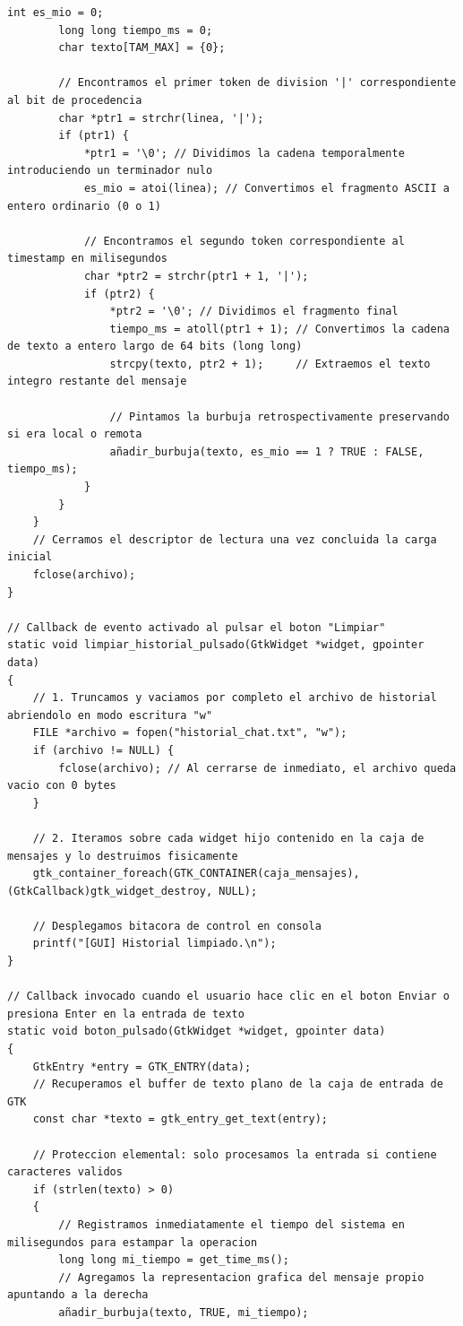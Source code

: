 \begin{lstlisting}[style=estiloC, caption={Archivo del Front-End (conexion P2P)}]
        int es_mio = 0;
        long long tiempo_ms = 0;
        char texto[TAM_MAX] = {0};

        // Encontramos el primer token de division '|' correspondiente al bit de procedencia
        char *ptr1 = strchr(linea, '|');
        if (ptr1) {
            *ptr1 = '\0'; // Dividimos la cadena temporalmente introduciendo un terminador nulo
            es_mio = atoi(linea); // Convertimos el fragmento ASCII a entero ordinario (0 o 1)
            
            // Encontramos el segundo token correspondiente al timestamp en milisegundos
            char *ptr2 = strchr(ptr1 + 1, '|');
            if (ptr2) {
                *ptr2 = '\0'; // Dividimos el fragmento final
                tiempo_ms = atoll(ptr1 + 1); // Convertimos la cadena de texto a entero largo de 64 bits (long long)
                strcpy(texto, ptr2 + 1);     // Extraemos el texto integro restante del mensaje
                
                // Pintamos la burbuja retrospectivamente preservando si era local o remota
                añadir_burbuja(texto, es_mio == 1 ? TRUE : FALSE, tiempo_ms);
            }
        }
    }
    // Cerramos el descriptor de lectura una vez concluida la carga inicial
    fclose(archivo);
}

// Callback de evento activado al pulsar el boton "Limpiar"
static void limpiar_historial_pulsado(GtkWidget *widget, gpointer data)
{
    // 1. Truncamos y vaciamos por completo el archivo de historial abriendolo en modo escritura "w"
    FILE *archivo = fopen("historial_chat.txt", "w");
    if (archivo != NULL) {
        fclose(archivo); // Al cerrarse de inmediato, el archivo queda vacio con 0 bytes
    }

    // 2. Iteramos sobre cada widget hijo contenido en la caja de mensajes y lo destruimos fisicamente
    gtk_container_foreach(GTK_CONTAINER(caja_mensajes), (GtkCallback)gtk_widget_destroy, NULL);
    
    // Desplegamos bitacora de control en consola
    printf("[GUI] Historial limpiado.\n");
}

// Callback invocado cuando el usuario hace clic en el boton Enviar o presiona Enter en la entrada de texto
static void boton_pulsado(GtkWidget *widget, gpointer data)
{
    GtkEntry *entry = GTK_ENTRY(data);
    // Recuperamos el buffer de texto plano de la caja de entrada de GTK
    const char *texto = gtk_entry_get_text(entry);

    // Proteccion elemental: solo procesamos la entrada si contiene caracteres validos
    if (strlen(texto) > 0)
    {
        // Registramos inmediatamente el tiempo del sistema en milisegundos para estampar la operacion
        long long mi_tiempo = get_time_ms();
        // Agregamos la representacion grafica del mensaje propio apuntando a la derecha
        añadir_burbuja(texto, TRUE, mi_tiempo);


\end{lstlisting}
